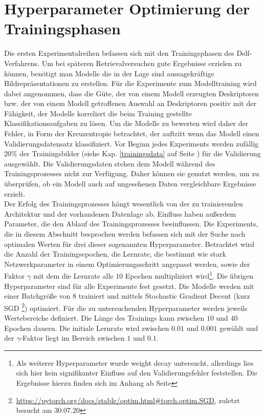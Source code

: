 \section{Hyperparameter Optimierung der Trainingsphasen}
Die ersten Experimentalreihen befassen sich mit den Trainingsphasen des Delf-Verfahrens. Um bei späteren Retrievalversuchen gute Ergebnisse erzielen zu können, benötigt man Modelle die in der Lage sind aussagekräftige Bildrepräsentationen zu erstellen. Für die Experimente zum Modelltraining wird dabei angenommen, dass die Güte, der von einem Modell erzeugten Deskriptoren bzw. der von einem Modell getroffenen Auswahl an Deskriptoren positiv mit der Fähigkeit, der Modelle korreliert die beim Training gestellte Klassifikationsaufgaben zu lösen. Um die Modelle zu bewerten wird daher der Fehler, in Form der Kreuzentropie betrachtet, der auftritt wenn das Modell einen Validierungsdatensatz klassifiziert. Vor Beginn jedes Experiments werden zufällig $20\%$ der Trainingsbilder (siehe Kap. \ref{trainingsdata} auf Seite \pageref{trainingsdata}) für die Validierung ausgewählt. Die Validierungsdaten stehen dem Modell während des Trainingsprozesses nicht zur Verfügung. Daher können sie genutzt werden, um zu überprüfen, ob ein Modell auch auf ungesehenen Daten vergleichbare Ergebnisse erzielt.
\\
Der Erfolg des Trainingsprozesses hängt wesentlich von der zu trainierenden Architektur und der vorhandenen Datenlage ab. Einfluss haben außerdem Parameter, die den Ablauf des Trainingsprozesses beeinflussen. Die Experiments, die in diesem Abschnitt besprochen werden befassen sich mit der Suche nach optimalen Werten für drei dieser sogenannten Hyperparameter. Betrachtet wird die Anzahl der Trainingsepochen, die Lernrate, die bestimmt wie stark Netzwerkparameter in einem Optimierungsschritt angepasst werden, sowie der Faktor $\gamma$ mit dem die Lernrate alle $10$ Epochen multipliziert wird\footnote{Als weiterer Hyperparameter wurde weight decay untersucht, allerdings lies sich hier kein signifikanter Einfluss auf den Validierungsfehler feststellen. Die Ergebnisse hierzu finden sich im Anhang ab Seite \pageref{weight_decay}}. Die übrigen Hyperparameter sind für alle Experimente fest gesetzt. Die Modelle werden mit einer Batchgröße von $8$ trainiert und mittels Stochastic Gradient Decent (kurz SGD \footnote{\url{https://pytorch.org/docs/stable/optim.html\#torch.optim.SGD}, zuletzt besucht am 30.07.20}) optimiert. Für die zu untersuchenden Hyperparameter werden jeweils Wertebereiche definiert. Die Länge des Trainings kann zwischen $10$ und $40$ Epochen dauern. Die initiale Lernrate wird zwischen $0.01$ und $0.001$ gewählt und der $\gamma$-Faktor liegt im Bereich zwischen $1$ und $0.1$.
